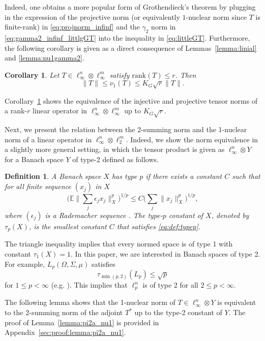 \documentclass[11pt]{article}
\newtheorem{cor}[lemma]{Corollary}
\newtheorem{defi}[lemma]{Definition}
\begin{document}
\noindent Indeed, one obtains a more popular form of Grothendieck's theorem by plugging in the expression of the projective norm (or equivalently $1$-nuclear norm since $T$ is finite-rank) in \eqref{eq:projnorm_infinf} and the $\gamma_2$ norm in \eqref{eq:gamma2_infinf_littlgGT} into the inequality in \eqref{eq:littleGT}. 
Furthermore, the following corollary is given as a direct consequence of Lemmas~\ref{lemma:linial} and \ref{lemma:nu1gamma2}.
\begin{cor}
\label{cor:injproj_infinf}
Let $T \in \ell_\infty^n \otimes \ell_\infty^m$ satisfy $\mathrm{rank}(T) \leq r$. Then
\[
\|T\| \leq \nu_1(T) \leq K_G \sqrt{r} \|T\|.
\]
\end{cor}
\noindent Corollary~\ref{cor:injproj_infinf} shows the equivalence of the injective and projective tensor norms of a rank-$r$ linear operator in $\ell_\infty^n \otimes \ell_\infty^m$ up to $K_G \sqrt{r}$.

Next, we present the relation between the 2-summing norm and the 1-nuclear norm of a linear operator in $\ell_\infty^n \otimes \ell_2^m$. 
Indeed, we show the norm equivalence in a slightly more general setting, in which the tensor product is given as $\ell_\infty^n \otimes Y$ for a Banach space $Y$ of type-2 defined as follows.
\begin{defi}
A Banach space $X$ has {\em type $p$} if there exists a constant $C$ such that for all finite sequence $(x_j)$ in $X$
\begin{equation}
\label{eq:def:typep}
\Big(\mathbb{E} \Big\|\sum_j \epsilon_j x_j\Big\|_X^p\Big)^{1/p} \leq C \Big(\sum_j \|x_j\|_X^p\Big)^{1/p},
\end{equation}
where $(\epsilon_j)$ is a Rademacher sequence \citep{pisier1999volume}.
The type-$p$ constant of $X$, denoted by $\tau_p(X)$, is the smallest constant $C$ that satisfies \eqref{eq:def:typep}.
\end{defi}

\noindent The triangle inequality implies that every normed space is of type 1 with constant $\tau_1(X) = 1$. In this paper, we are interested in Banach spaces of type 2. For example, $L_p(\Omega,\Sigma,\mu)$ satisfies
\[
\tau_{\min(p,2)}(L_p) \leq \sqrt{p}
\]
for $1 \leq p < \infty$ (e.g. \cite[Lemma~3]{carl1985inequalities}). This implies that $\ell_p^n$ is of type 2 for all $2 \leq p < \infty$.

The following lemma shows that the 1-nuclear norm of $T \in \ell_\infty^n \otimes Y$ is equivalent to the 2-summing norm of the adjoint $T^*$ up to the type-2 constant of $Y$. The proof of Lemma~\ref{lemma:pi2a_nu1} is provided in Appendix~\ref{sec:proof:lemma:pi2a_nu1}.
\end{document}
